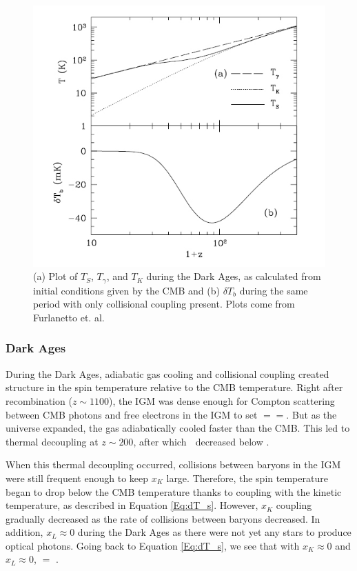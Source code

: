 \begin{figure}[htb]
\begin{center}
\includegraphics[width=0.9\linewidth]{Introduction/figures/dark_ages_global_spectrum.jpg}
\caption{(a) Plot of $T_S$, $T_\gamma$, and $T_K$ during the Dark Ages, as calculated from initial conditions given by the CMB and (b) $\delta T_b$ during the same period with only collisional coupling present. Plots come from Furlanetto et. al. \cite{furlanetto_2006}}
\label{Fig:da_global}
\end{center}
\end{figure}

\subsubsection{Dark Ages}

During the Dark Ages, adiabatic gas cooling and collisional coupling created structure in the spin temperature relative to the CMB temperature. Right after recombination ($z \sim 1100$), the IGM was dense enough for Compton scattering between CMB photons and free electrons in the IGM to set \tk$=$\tg$=$\ts. But as the universe expanded, the gas adiabatically cooled faster than the CMB. This led to thermal decoupling at $z \sim 200$, after which \tk $\;$ decreased below \tg \cite{furlanetto_2006}. 

When this thermal decoupling occurred, collisions between baryons in the IGM were still frequent enough to keep $x_K$ large. Therefore, the spin temperature began to drop below the CMB temperature thanks to coupling with the kinetic temperature, as described in Equation \ref{Eq:dT_s}. However, $x_K$ coupling gradually decreased as the rate of collisions between baryons decreased. In addition, $x_L \approx 0$ during the Dark Ages as there were not yet any stars to produce optical photons. Going back to Equation \ref{Eq:dT_s}, we see that with $x_K \approx 0$ and $x_L \approx 0$, \ts $=$ \tg. 

